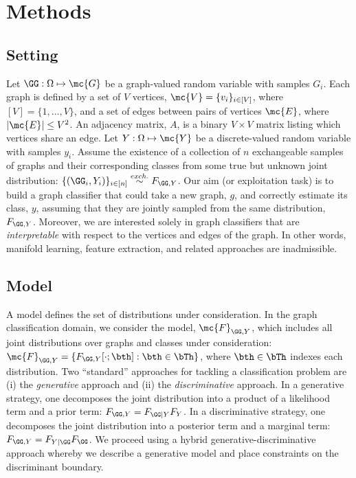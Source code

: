 \documentclass[10pt,journal,cspaper,compsoc]{IEEEtran}
\begin{document}
\section{Methods} %
\label{sec:methods}


\subsection{Setting}

Let $\GG: \Omega \mapsto \mc{G}$ be a graph-valued random variable with samples $G_i$.  Each graph is defined by a set of $V$ vertices, $\mc{V}=\{v_i\}_{i \in [V]}$, where $[V]=\{1,\ldots, V\}$, and a set of edges between pairs of vertices $\mc{E}$, where $|\mc{E}| \leq V^2$. An adjacency matrix, $A$, is a binary $V \times V$ matrix listing  which vertices share an edge. Let $Y:\Omega \mapsto \mc{Y}$ be a discrete-valued random variable with samples $y_i$.  Assume the existence of a collection of $n$ exchangeable samples of graphs and their corresponding classes from some true but unknown joint distribution: $\{(\GG_i,Y_i)\}_{i \in [n]} \overset{exch.}{\sim} F_{\GG,Y}$. Our aim (or exploitation task) is to build a graph classifier that could take a new graph, $g$, and correctly estimate its class, $y$, assuming that they are jointly sampled from the same distribution, $F_{\GG,Y}$.  Moreover, we are interested solely in graph classifiers that are \emph{interpretable} with respect to the vertices and edges of the graph. In other words, manifold learning, feature extraction, and related approaches are inadmissible.  

\subsection{Model} %
\label{sub:model}

A model defines the set of distributions under consideration.  In the graph classification domain, we consider the model, $\mc{F}_{\GG,Y}$, which includes all joint distributions over graphs and classes under consideration: $\mc{F}_{\GG,Y}=\{F_{\GG, Y}[\cdot; \bth] : \bth \in \bTh\}$, where $\bth \in \bTh$ indexes each distribution.  Two ``standard'' approaches for tackling a classification problem are (i) the \emph{generative} approach and (ii) the \emph{discriminative} approach.  In a generative strategy, one decomposes the joint distribution into a product of a likelihood term and a prior term:  $F_{\GG,Y}=F_{\GG | Y}F_Y$.  In a discriminative strategy, one decomposes the joint distribution into a posterior term and a marginal term: $F_{\GG,Y}=F_{Y | \GG}F_{\GG}$.  We proceed using a hybrid generative-discriminative approach whereby we describe a generative model and place constraints on the discriminant boundary.
\end{document}
